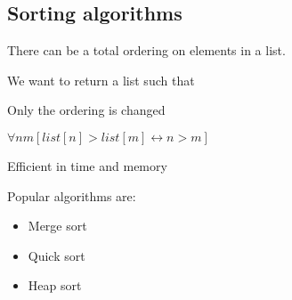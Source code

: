 
\subsection{Sorting algorithms}

There can be a total ordering on elements in a list.

We want to return a list such that

Only the ordering is changed

\(\forall nm [list[n]>list[m] \leftrightarrow n>m]\)

Efficient in time and memory

Popular algorithms are:

\begin{itemize}
\item Merge sort
\item Quick sort
\item Heap sort
\end{itemize}

